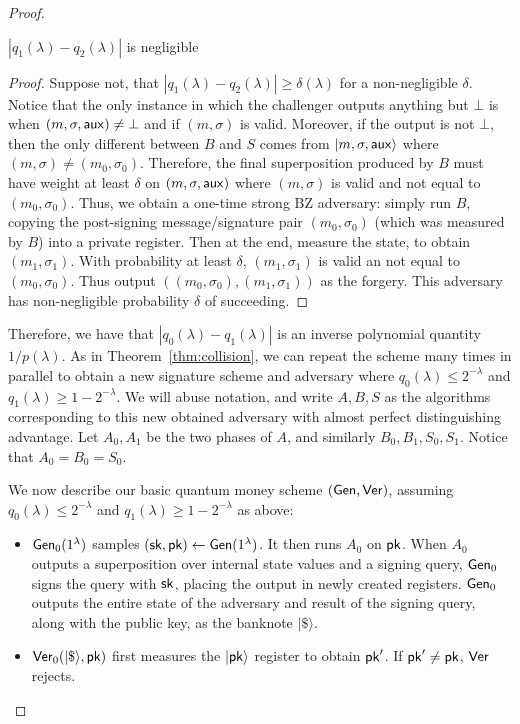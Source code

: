\begin{proof}
\begin{claim}$|q_1(\lambda)-q_2(\lambda)|$ is negligible
\end{claim}
\begin{proof} Suppose not, that $|q_1(\lambda)-q_2(\lambda)|\geq \delta(\lambda)$ for a non-negligible $\delta$.  Notice that the only instance in which the challenger outputs anything but $\bot$ is when $(m,\sigma,{\sf aux})\neq\bot$ and if $(m,\sigma)$ is valid.  Moreover, if the output is not $\bot$, then the only different between $B$ and $S$ comes from $|m,\sigma,{\sf aux}\rangle$ where $(m,\sigma)\neq (m_0,\sigma_0)$.  Therefore, the final superposition produced by $B$ must have weight at least $\delta$ on $(m,\sigma,{\sf aux})$ where $(m,\sigma)$ is valid and not equal to $(m_0,\sigma_0)$.  Thus, we obtain a one-time strong BZ adversary: simply run $B$, copying the post-signing message/signature pair $(m_0,\sigma_0)$ (which was measured by $B$) into a private register.  Then at the end, measure the state, to obtain $(m_1,\sigma_1)$.  With probability at least $\delta$, $(m_1,\sigma_1)$ is valid an not equal to $(m_0,\sigma_0)$.  Thus output $((m_0,\sigma_0),(m_1,\sigma_1))$ as the forgery.  This adversary has non-negligible probability $\delta$ of succeeding.
\end{proof}

Therefore, we have that $|q_0(\lambda)-q_1(\lambda)|$ is an inverse polynomial quantity $1/p(\lambda)$.  As in Theorem~\ref{thm:collision}, we can repeat the scheme many times in parallel to obtain a new signature scheme and adversary where $q_0(\lambda)\leq 2^{-\lambda}$ and $q_1(\lambda)\geq 1-2^{-\lambda}$.  We will abuse notation, and write $A,B,S$ as the algorithms corresponding to this new obtained adversary with almost perfect distinguishing advantage.  Let $A_0,A_1$ be the two phases of $A$, and similarly $B_0,B_1,S_0,S_1$.  Notice that $A_0=B_0=S_0$.  

We now describe our basic  quantum money scheme $({\sf Gen},{\sf Ver})$, assuming $q_0(\lambda)\leq 2^{-\lambda}$ and $q_1(\lambda)\geq 1-2^{-\lambda}$ as above:
\begin{itemize}
	\item ${\sf Gen}_0(1^\lambda)$ samples $({\sf sk},{\sf pk})\gets{\sf Gen}(1^\lambda)$.  It then runs $A_0$ on ${\sf pk}$.  When $A_0$ outputs a superposition over internal state values and a signing query, ${\sf Gen}_0$ signs the query with ${\sf sk}$, placing the output in newly created registers.  ${\sf Gen}_0$ outputs the entire state of the adversary and result of the signing query, along with the public key, as the banknote $|\$\rangle$.
	\item ${\sf Ver}_0(|\$\rangle,{\sf pk})$ first measures the $|{\sf pk}\rangle$ register to obtain ${\sf pk}'$.  If ${\sf pk}'\neq {\sf pk}$, ${\sf Ver}$ rejects.


\end{itemize}
\end{proof}
